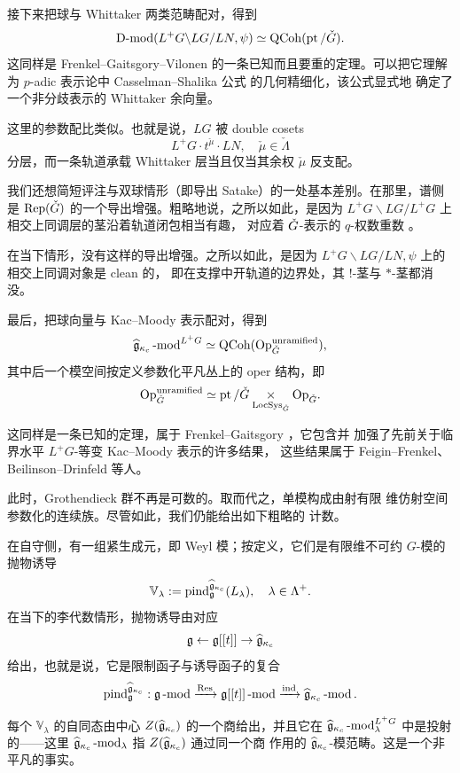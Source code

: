 \ssszh 接下来把球与 Whittaker 两类范畴配对，得到
%
\[
   \operatorname{D-mod}(L^+G \backslash LG / LN, \psi) \simeq \operatorname{QCoh}( \operatorname{pt} / \check{G}).
\]
%
这同样是 Frenkel--Gaitsgory--Vilonen \cite{fgv} 的一条已知而且要重的定理。可以把它理解为 $p$-adic 表示论中
Casselman--Shalika 公式 \cite{cassshalika} 的几何精细化，该公式显式地
确定了一个非分歧表示的 Whittaker 余向量。

这里的参数配比类似。也就是说，$LG$ 被 double cosets
\[
   L^+G \cdot t^{\check{\mu}} \cdot LN, \quad \check{\mu} \in \check{\Lambda}
\]
分层，而一条轨道承载 Whittaker 层当且仅当其余权 $\check{\mu}$ 反支配。

\begin{re} 我们还想简短评注与双球情形（即导出 Satake）的一处基本差别。在那里，谱侧是
$\operatorname{Rep}(\check{G})$ 的一个导出增强。粗略地说，之所以如此，是因为
$L^+G \backslash LG / L^+G$ 上相交上同调层的茎沿着轨道闭包相当有趣，
对应着 $\check{G}$-表示的 $q$-权数重数 \cite{lusztigqchar}。

在当下情形，没有这样的导出增强。之所以如此，是因为
$L^+G \backslash LG / LN, \psi$ 上的相交上同调对象是 clean 的，
即在支撑中开轨道的边界处，其 $!$-茎与 $*$-茎都消没。

\end{re}

\ssszh \label{ss:sphericalkmmod}最后，把球向量与 Kac--Moody 表示配对，得到
\[
   \widehat{\mathfrak{g}}_{\kappa_c}\operatorname{-mod}^{L^+G} \simeq \operatorname{QCoh}(\mathrm{Op}_{\check{G}}^{\operatorname{unramified}}),
\]
其中后一个模空间按定义参数化平凡丛上的 oper 结构，即
\[
\mathrm{Op}_{\check{G}}^{\operatorname{unramified}} \simeq \operatorname{pt} / \check{G} \underset {\operatorname{LocSys}_{\check{G}}} \times \mathrm{Op}_{\check{G}}.
\]

这同样是一条已知的定理，属于 Frenkel--Gaitsgory \cite{fg-sph}，它包含并
加强了先前关于临界水平 $L^+G$-等变 Kac--Moody 表示的许多结果，
这些结果属于 Feigin--Frenkel、Beilinson--Drinfeld 等人。

此时，Grothendieck 群不再是可数的。取而代之，单模构成由射有限
维仿射空间参数化的连续族。尽管如此，我们仍能给出如下粗略的
计数。

在自守侧，有一组紧生成元，即 Weyl 模；按定义，它们是有限维不可约
$G$-模的抛物诱导
\[
  \mathbb{V}_\lambda := \operatorname{pind}_{\mathfrak{g}}^{\widehat{\mathfrak{g}}_{\kappa_c}}(L_\lambda), \quad \lambda \in \Lambda^+.
\]
在当下的李代数情形，抛物诱导由对应
\[
  \mathfrak{g} \leftarrow \mathfrak{g}[[t]] \rightarrow \widehat{\mathfrak{g}}_{\kappa_c}
\]
给出，也就是说，它是限制函子与诱导函子的复合
%
\[
\operatorname{pind}_{\mathfrak{g}}^{\widehat{\mathfrak{g}}_{\kappa_c}}: \mathfrak{g}\operatorname{-mod} \xrightarrow{\operatorname{Res}} \mathfrak{g}[[t]]\operatorname{-mod} \xrightarrow{\operatorname{ind}} \widehat{\mathfrak{g}}_{\kappa_c}\operatorname{-mod}.
\]
%

每个 $\mathbb{V}_\lambda$ 的自同态由中心 $Z(\widehat{\mathfrak{g}}_{\kappa_c})$ 的一个商给出，并且它在
$\widehat{\mathfrak{g}}_{\kappa_c}\operatorname{-mod}^{L^+G}_\lambda$ 中是投射的——这里 $\widehat{\mathfrak{g}}_{\kappa_c}\operatorname{-mod}_\lambda$ 指 $Z(\widehat{\mathfrak{g}}_{\kappa_c})$ 通过同一个商
作用的 $\widehat{\mathfrak{g}}_{\kappa_c}$-模范畴。这是一个非平凡的事实。

